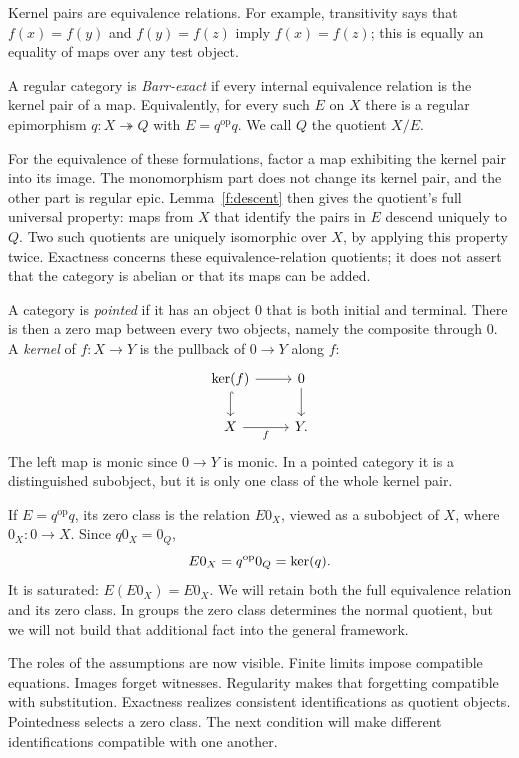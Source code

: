 Kernel pairs are equivalence relations. For example, transitivity says
that $f(x)=f(y)$ and $f(y)=f(z)$ imply $f(x)=f(z)$; this is equally an
equality of maps over any test object.

\begin{definition}\label{f:exact}
A regular category is \emph{Barr-exact} if every internal equivalence
relation is the kernel pair of a map. Equivalently, for every such
$E$ on $X$ there is a regular epimorphism $q:X\twoheadrightarrow Q$
with $E=q^{\mathrm{op}}q$. We call $Q$ the quotient $X/E$.
\end{definition}

For the equivalence of these formulations, factor a map exhibiting the
kernel pair into its image. The monomorphism part does not change its
kernel pair, and the other part is regular epic. Lemma~\ref{f:descent}
then gives the quotient's full universal property: maps from $X$ that
identify the pairs in $E$ descend uniquely to $Q$. Two such quotients
are uniquely isomorphic over $X$, by applying this property twice.
Exactness concerns these equivalence-relation quotients; it does not
assert that the category is abelian or that its maps can be added.

A category is \emph{pointed} if it has an object $0$ that is both initial
and terminal. There is then a zero map between every two objects, namely
the composite through $0$. A \emph{kernel} of $f:X\to Y$ is the
pullback of $0\to Y$ along $f$:
\[
\begin{tikzcd}
\Ker(f) \arrow[r] \arrow[d,hook] & 0 \arrow[d]\\
X \arrow[r,"f"'] & Y.
\end{tikzcd}
\]
The left map is monic since $0\to Y$ is monic. In a pointed category
it is a distinguished subobject, but it is only one class of the whole
kernel pair.

If $E=q^{\mathrm{op}}q$, its zero class is the relation $E0_X$,
viewed as a subobject of $X$, where $0_X:0\to X$. Since $q0_X=0_Q$,
\[
E0_X=q^{\mathrm{op}}0_Q=\operatorname{ker}(q).
\]
It is saturated: $E(E0_X)=E0_X$. We will retain both the full
equivalence relation and its zero class. In groups the zero class
determines the normal quotient, but we will not build that additional
fact into the general framework.

The roles of the assumptions are now visible. Finite limits impose
compatible equations. Images forget witnesses. Regularity makes that
forgetting compatible with substitution. Exactness realizes consistent
identifications as quotient objects. Pointedness selects a zero class.
The next condition will make different identifications compatible with
one another.
